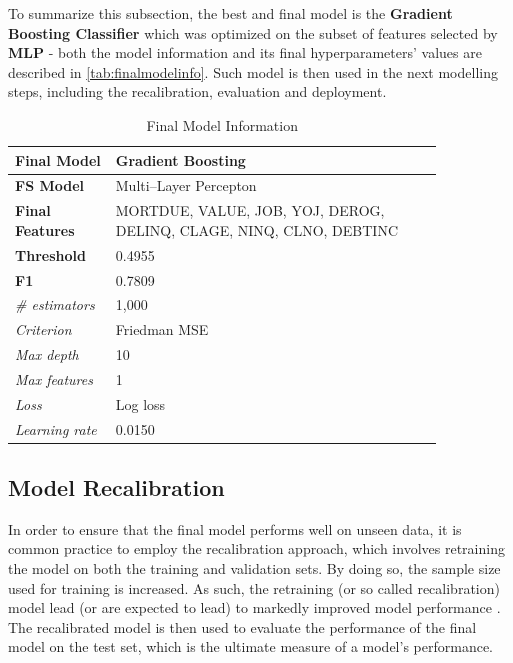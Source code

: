 To summarize this subsection, the best and final model is the \textbf{Gradient Boosting Classifier} which was optimized on the subset of features selected by \textbf{MLP} - both the model information and its final hyperparameters' values are described in \autoref{tab:finalmodelinfo}. Such model is then used in the next modelling steps, including the recalibration, evaluation and deployment.
\begin{table}[H]
    \small
    \setlength{\tabcolsep}{8pt}
    \renewcommand{\arraystretch}{1.3}
    \centering
    \caption{Final Model Information}\label{tab:finalmodelinfo}
    \begin{tabular}{>{\raggedleft\arraybackslash}p{0.20\linewidth}|p{0.65\linewidth}}
    \toprule
    \midrule
    \textbf{Final Model} & Gradient Boosting \\
    \midrule
    \textbf{FS Model} & Multi--Layer Percepton \\
    \midrule
    \textbf{Final Features} &
    MORTDUE, VALUE, JOB, YOJ, DEROG, DELINQ, CLAGE, NINQ, CLNO, DEBTINC \\
    \midrule
    \textbf{Threshold} & 0.4955 \\
    \midrule
    \textbf{F1} & 0.7809 \\
    \midrule
    \textit{\# estimators} & 1,000 \\
    \midrule
    \textit{Criterion} & Friedman MSE \\
    \midrule
    \textit{Max depth} & 10 \\
    \midrule
    \textit{Max features} & 1 \\
    \midrule
    \textit{Loss} & Log loss \\
    \midrule
    \textit{Learning rate} & 0.0150 \\
    \midrule
    \bottomrule
    \end{tabular}
    \vspace{0.5em}
    
    \vspace{-0.5em}
\end{table}

\newpage
\subsection{Model Recalibration}
\label{subsec:modelrecal}

In order to ensure that the final model performs well on unseen data, it is common practice to employ the recalibration approach, which involves retraining the model on both the training and validation sets.
By doing so, the sample size used for training is increased. As such, the retraining (or so called recalibration) model lead (or are expected to lead) to markedly improved model performance \citep{de2023predicting}.
The recalibrated model is then used to evaluate the performance of the final model on the test set, which is the ultimate measure of a model's performance.

